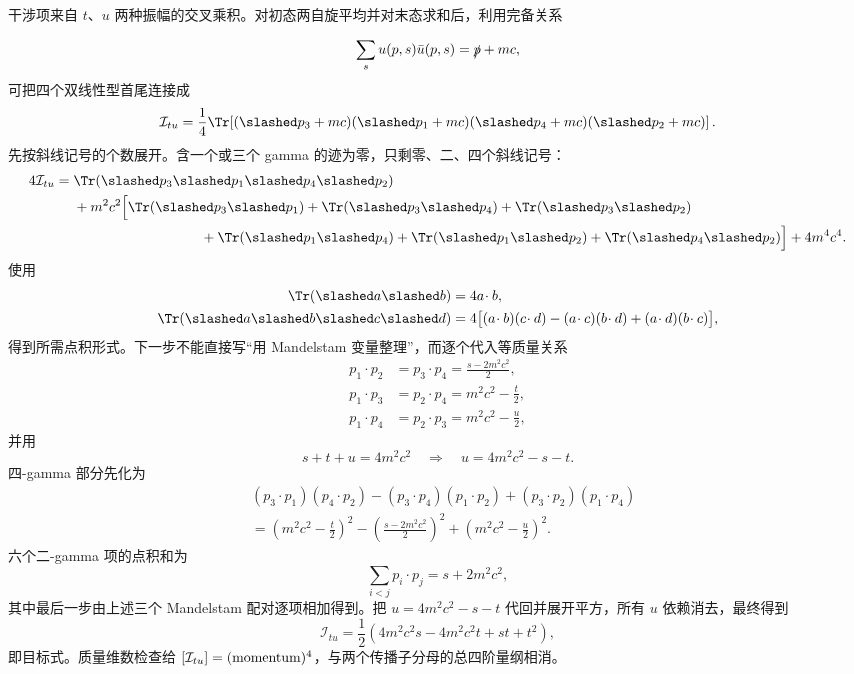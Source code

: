 \begin{derivation}[相同费米子交换通道的干涉]
干涉项来自 $t$、$u$ 两种振幅的交叉乘积。对初态两自旋平均并对末态求和后，利用完备关系

\begin{equation*}
\sum_su(p,s)\bar u(p,s)=\slashed p+mc,
\end{equation*}
可把四个双线性型首尾连接成
\begin{equation*}
\mathcal I_{tu}
=\frac14\Tr\!\left[
(\slashed p_3+mc)(\slashed p_1+mc)
(\slashed p_4+mc)(\slashed p_2+mc)
\right].
\end{equation*}
先按斜线记号的个数展开。含一个或三个 gamma 的迹为零，只剩零、二、四个斜线记号：
\begin{align*}
4\mathcal I_{tu}
={}&\Tr(\slashed p_3\slashed p_1\slashed p_4\slashed p_2)\\
&+m^2c^2\Bigl[
\Tr(\slashed p_3\slashed p_1)
+\Tr(\slashed p_3\slashed p_4)
+\Tr(\slashed p_3\slashed p_2)\\
&\hspace{3.2cm}
+\Tr(\slashed p_1\slashed p_4)
+\Tr(\slashed p_1\slashed p_2)
+\Tr(\slashed p_4\slashed p_2)
\Bigr]
+4m^4c^4.
\end{align*}
使用
\begin{align*}
\Tr(\slashed a\slashed b)&=4a\!\cdot b,\\
\Tr(\slashed a\slashed b\slashed c\slashed d)
&=4\bigl[(a\!\cdot b)(c\!\cdot d)
-(a\!\cdot c)(b\!\cdot d)
+(a\!\cdot d)(b\!\cdot c)\bigr],
\end{align*}
得到所需点积形式。下一步不能直接写“用 Mandelstam 变量整理”，而逐个代入等质量关系
\begin{align*}
p_1\!\cdot p_2&=p_3\!\cdot p_4=\frac{s-2m^2c^2}{2},\\
p_1\!\cdot p_3&=p_2\!\cdot p_4=m^2c^2-\frac t2,\\
p_1\!\cdot p_4&=p_2\!\cdot p_3=m^2c^2-\frac u2,
\end{align*}
并用
\begin{equation*}
s+t+u=4m^2c^2
\quad\Longrightarrow\quad
u=4m^2c^2-s-t.
\end{equation*}
四-gamma 部分先化为
\begin{align*}
&(p_3\!\cdot p_1)(p_4\!\cdot p_2)
-(p_3\!\cdot p_4)(p_1\!\cdot p_2)
+(p_3\!\cdot p_2)(p_1\!\cdot p_4)\\
&=\left(m^2c^2-\frac t2\right)^2
-\left(\frac{s-2m^2c^2}{2}\right)^2
+\left(m^2c^2-\frac u2\right)^2.
\end{align*}
六个二-gamma 项的点积和为
\begin{equation*}
\sum_{i<j}p_i\!\cdot p_j
=s+2m^2c^2,
\end{equation*}
其中最后一步由上述三个 Mandelstam 配对逐项相加得到。把 $u=4m^2c^2-s-t$ 代回并展开平方，所有 $u$ 依赖消去，最终得到
\begin{equation*}
\mathcal I_{tu}
=\frac12\left(4m^2c^2s-4m^2c^2t+st+t^2\right),
\end{equation*}
即目标式。质量维数检查给 $[\mathcal I_{tu}]=({\rm momentum})^4$，与两个传播子分母的总四阶量纲相消。
\end{derivation}


